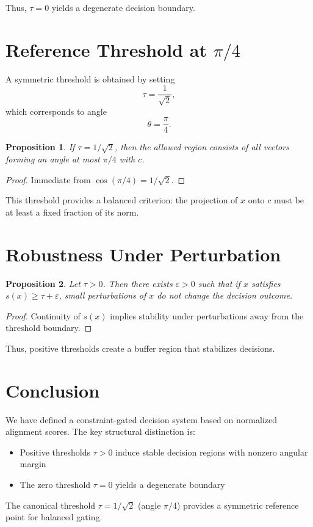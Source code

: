 \documentclass[11pt]{article}
\theoremstyle{plain}
\newtheorem{proposition}{Proposition}
\theoremstyle{definition}
\begin{document}
Thus, $\tau = 0$ yields a degenerate decision boundary.

\section{Reference Threshold at $\pi/4$}

A symmetric threshold is obtained by setting
\[
\tau = \frac{1}{\sqrt{2}},
\]
which corresponds to angle
\[
\theta = \frac{\pi}{4}.
\]

\begin{proposition}
If $\tau = 1/\sqrt{2}$, then the allowed region consists of all vectors forming an angle at most $\pi/4$ with $c$.
\end{proposition}

\begin{proof}
Immediate from $\cos(\pi/4)=1/\sqrt{2}$.
\end{proof}

This threshold provides a balanced criterion: the projection of $x$ onto $c$ must be at least a fixed fraction of its norm.

\section{Robustness Under Perturbation}

\begin{proposition}
Let $\tau > 0$. Then there exists $\varepsilon > 0$ such that if $x$ satisfies $s(x) \ge \tau + \varepsilon$, small perturbations of $x$ do not change the decision outcome.
\end{proposition}

\begin{proof}
Continuity of $s(x)$ implies stability under perturbations away from the threshold boundary.
\end{proof}

Thus, positive thresholds create a buffer region that stabilizes decisions.

\section{Conclusion}

We have defined a constraint-gated decision system based on normalized alignment scores. The key structural distinction is:

\begin{itemize}
    \item Positive thresholds $\tau > 0$ induce stable decision regions with nonzero angular margin
    \item The zero threshold $\tau = 0$ yields a degenerate boundary
\end{itemize}

The canonical threshold $\tau = 1/\sqrt{2}$ (angle $\pi/4$) provides a symmetric reference point for balanced gating.
\end{document}
